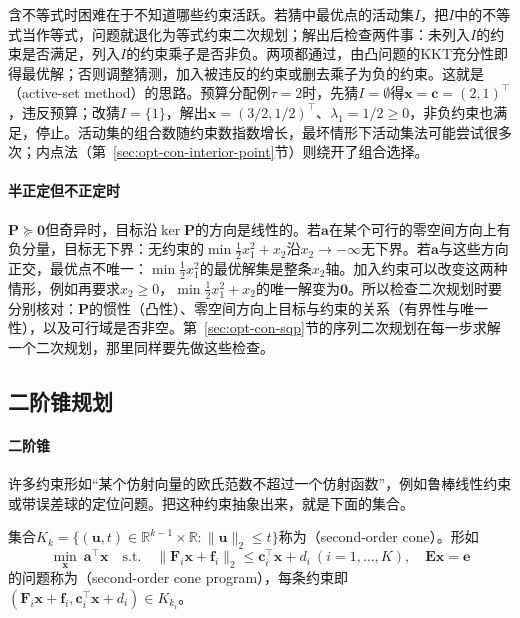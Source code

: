 含不等式时困难在于不知道哪些约束活跃。若猜中最优点的活动集$I$，把$I$中的不等式当作等式，问题就退化为等式约束二次规划；解出后检查两件事：未列入$I$的约束是否满足，列入$I$的约束乘子是否非负。两项都通过，由凸问题的KKT充分性即得最优解；否则调整猜测，加入被违反的约束或删去乘子为负的约束。这就是（active-set method）的思路。预算分配例$\tau=2$时，先猜$I=\emptyset$得$\bm x=\bm c=(2,1)^\top$，违反预算；改猜$I=\{1\}$，解出$\bm x=(3/2,1/2)^\top$、$\lambda_1=1/2\geq0$，非负约束也满足，停止。活动集的组合数随约束数指数增长，最坏情形下活动集法可能尝试很多次；内点法（第~\ref{sec:opt-con-interior-point}节）则绕开了组合选择。

\paragraph{半正定但不正定时}
$\bm P\succeq\bm0$但奇异时，目标沿$\ker\bm P$的方向是线性的。若$\bm a$在某个可行的零空间方向上有负分量，目标无下界：无约束的$\min\frac12x_1^2+x_2$沿$x_2\to-\infty$无下界。若$\bm a$与这些方向正交，最优点不唯一：$\min\frac12x_1^2$的最优解集是整条$x_2$轴。加入约束可以改变这两种情形，例如再要求$x_2\geq0$，$\min\frac12x_1^2+x_2$的唯一解变为$\bm0$。所以检查二次规划时要分别核对：$\bm P$的惯性（凸性）、零空间方向上目标与约束的关系（有界性与唯一性），以及可行域是否非空。第~\ref{sec:opt-con-sqp}节的序列二次规划在每一步求解一个二次规划，那里同样要先做这些检查。

\subsection{二阶锥规划}
\label{sec:opt-con-socp}

\paragraph{二阶锥}
许多约束形如“某个仿射向量的欧氏范数不超过一个仿射函数”，例如鲁棒线性约束或带误差球的定位问题。把这种约束抽象出来，就是下面的集合。

\begin{definition}[二阶锥与二阶锥规划]
\label{def:opt-con-socp}
集合$K_k=\{(\bm u,t)\in\mathbb R^{k-1}\times\mathbb R:\lVert\bm u\rVert_2\leq t\}$称为（second-order cone）。形如
\[
  \min_{\bm x}\ \bm a^\top\bm x\quad\text{s.t.}\quad\lVert\bm F_i\bm x+\bm f_i\rVert_2\leq\bm c_i^\top\bm x+d_i\ (i=1,\dots,K),\quad\bm E\bm x=\bm e
\]
的问题称为（second-order cone program），每条约束即$(\bm F_i\bm x+\bm f_i,\bm c_i^\top\bm x+d_i)\in K_{k_i}$。
\end{definition}

